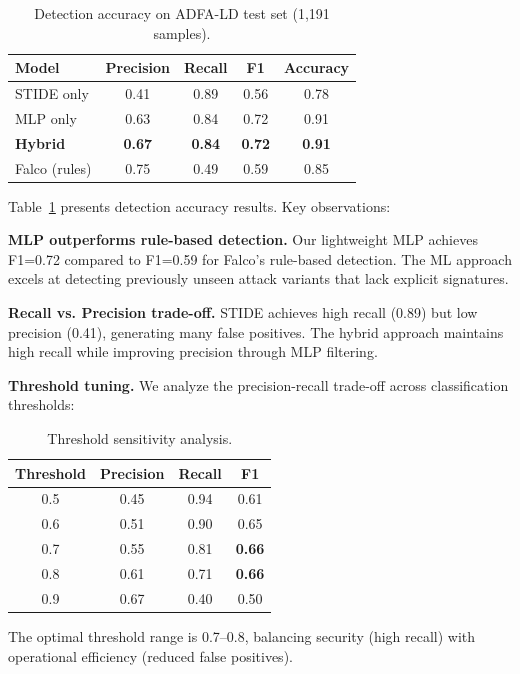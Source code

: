 \begin{table}[t]
\centering
\caption{Detection accuracy on ADFA-LD test set (1,191 samples).}
\label{tab:accuracy}
\begin{tabular}{lcccc}
\toprule
\textbf{Model} & \textbf{Precision} & \textbf{Recall} & \textbf{F1} & \textbf{Accuracy} \\
\midrule
STIDE only & 0.41 & 0.89 & 0.56 & 0.78 \\
MLP only & 0.63 & 0.84 & 0.72 & 0.91 \\
\textbf{Hybrid} & \textbf{0.67} & \textbf{0.84} & \textbf{0.72} & \textbf{0.91} \\
\midrule
Falco (rules) & 0.75 & 0.49 & 0.59 & 0.85 \\
\bottomrule
\end{tabular}
\end{table}

Table~\ref{tab:accuracy} presents detection accuracy results.
Key observations:

\textbf{MLP outperforms rule-based detection.}
Our lightweight MLP achieves F1=0.72 compared to F1=0.59 for Falco's rule-based detection.
The ML approach excels at detecting previously unseen attack variants that lack explicit signatures.

\textbf{Recall vs. Precision trade-off.}
STIDE achieves high recall (0.89) but low precision (0.41), generating many false positives.
The hybrid approach maintains high recall while improving precision through MLP filtering.

\textbf{Threshold tuning.}
We analyze the precision-recall trade-off across classification thresholds:

\begin{table}[t]
\centering
\caption{Threshold sensitivity analysis.}
\label{tab:threshold}
\begin{tabular}{cccc}
\toprule
\textbf{Threshold} & \textbf{Precision} & \textbf{Recall} & \textbf{F1} \\
\midrule
0.5 & 0.45 & 0.94 & 0.61 \\
0.6 & 0.51 & 0.90 & 0.65 \\
0.7 & 0.55 & 0.81 & \textbf{0.66} \\
0.8 & 0.61 & 0.71 & \textbf{0.66} \\
0.9 & 0.67 & 0.40 & 0.50 \\
\bottomrule
\end{tabular}
\end{table}

The optimal threshold range is 0.7--0.8, balancing security (high recall) with operational efficiency (reduced false positives).

